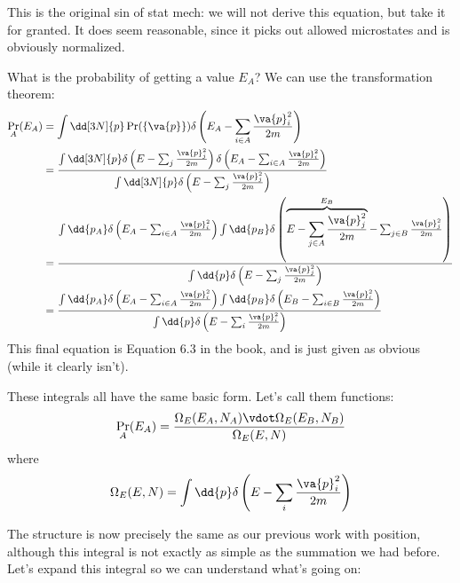 \documentclass[a4paper,twoside,master.tex]{subfiles}
\begin{document}
This is the original sin of stat mech: we will not derive this equation, but take it for granted. It does seem reasonable, since it picks out allowed microstates and is obviously normalized.

What is the probability of getting a value $ E_A $? We can use the transformation theorem:
\begin{align}
    \Pr_{A}(E_A) &= \int \dd[3N]{p} \Pr(\{\va{p}\}) \delta\left(E_A - \sum_{i \in A} \frac{\va{p}^2_i}{2m}\right) \\
    &= \frac{\int \dd[3N]{p} \delta\left( E - \sum_j \frac{\va{p}_j^2}{2m} \right) \delta\left( E_A - \sum_{i \in A} \frac{\va{p}_i^2}{2m} \right)}{\int \dd[3N]{p} \delta\left( E - \sum_j \frac{\va{p}_j^2}{2m} \right)} \\
    &= \frac{\int \dd{p_A} \delta\left( E_A - \sum_{i \in A} \frac{\va{p}_i^2}{2m} \right) \int \dd{p_B} \delta\left( \overbrace{E - \sum_{j \in A} \frac{\va{p}^2_j}{2m}}^{E_B} - \sum_{j \in B} \frac{\va{p}^2_j}{2m} \right)}{\int \dd{p} \delta\left( E - \sum_j \frac{\va{p}_j^2}{2m} \right)} \\
    &= \frac{\int \dd{p_A} \delta\left( E_A - \sum_{i \in A} \frac{\va{p}_i^2}{2m} \right) \int \dd{p_B} \delta\left( E_B - \sum_{i \in B} \frac{\va{p}_i^2}{2m} \right)}{\int \dd{p} \delta\left( E - \sum_i \frac{\va{p}^2_i}{2m} \right)}
\end{align}
This final equation is Equation $ 6.3 $ in the book, and is just given as obvious (while it clearly isn't).

These integrals all have the same basic form. Let's call them functions:
\begin{equation}
    \Pr_{A}(E_A) = \frac{\Omega_E(E_A, N_A) \vdot \Omega_E(E_B, N_B)}{\Omega_E(E, N)}
\end{equation}
where
\begin{equation}
    \Omega_E(E, N) = \int \dd{p} \delta\left( E - \sum_i \frac{\va{p}_i^2}{2m} \right)
\end{equation}

The structure is now precisely the same as our previous work with position, although this integral is not exactly as simple as the summation we had before. Let's expand this integral so we can understand what's going on:
\end{document}
